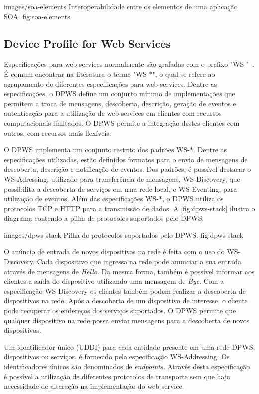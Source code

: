   {images/soa-elements}
  {Interoperabilidade entre os elementos de uma aplicação SOA.}
  {fig:soa-elements}


\subsection{Device Profile for Web Services}

Especificações para web services normalmente são grafadas com o prefixo
"{WS-}"~\cite{candido2013soa}. É comum encontrar na literatura o termo "{WS-*}", o qual se refere ao
agrupamento de diferentes especificações para web services. Dentre as especificações, o \gls{DPWS}
define um conjunto mínimo de implementações que permitem a troca de mensagens, descoberta,
descrição, geração de eventos e autenticação para a utilização de web services em clientes com
recursos computacionais limitados. O \gls{DPWS} permite a integração destes clientes com outros, com
recursos mais flexíveis.

O \gls{DPWS} implementa um conjunto restrito dos padrões {WS-*}. Dentre as especificações
utilizadas, estão definidos formatos para o envio de mensagens de descoberta, descrição e
notificação de eventos. Dos padrões, é possível destacar o {WS-Adressing}, utilizado para
transferência de mensagens, {WS-Discovery}, que possibilita a descoberta de serviços em uma rede
local, e {WS-Eventing}, para utilização de eventos. Além das especificações {WS-*}, o \gls{DPWS}
utiliza os protocolos \gls{TCP} e \gls{HTTP} para a transmissão de dados. A \cref{fig:dpws-stack}
ilustra o diagrama contendo a pilha de protocolos suportados pelo \gls{DPWS}.

  {images/dpws-stack}
  {Pilha de protocolos suportados pelo DPWS.}
  {fig:dpws-stack}

O anúncio de entrada de novos dispositivos na rede é feita com o uso do {WS-Discovery}. Cada
dispositivo que ingressa na rede pode anunciar a sua entrada através de mensagens de \emph{Hello}.
Da mesma forma, também é possível informar aos clientes a saída do dispositivo utilizando uma
mensagem de \emph{Bye}. Com a especificação {WS-Discovery} os clientes também podem realizar a
descoberta de dispositivos na rede. Após a descoberta de um dispositivo de interesse, o cliente pode
recuperar os endereços dos serviços suportados. O \gls{DPWS} permite que qualquer dispositivo na
rede possa enviar mensagens para a descoberta de novos dispositivos.

Um identificador único (\gls{UDDI}) para cada entidade presente em uma rede \gls{DPWS}, dispositivos
ou serviços, é fornecido pela especificação {WS-Addressing}. Os identificadores únicos são
denominados de \textit{endpoints}. Através desta especificação, é possível a utilização de
diferentes protocolos de transporte sem que haja necessidade de alteração na implementação do web
service.

